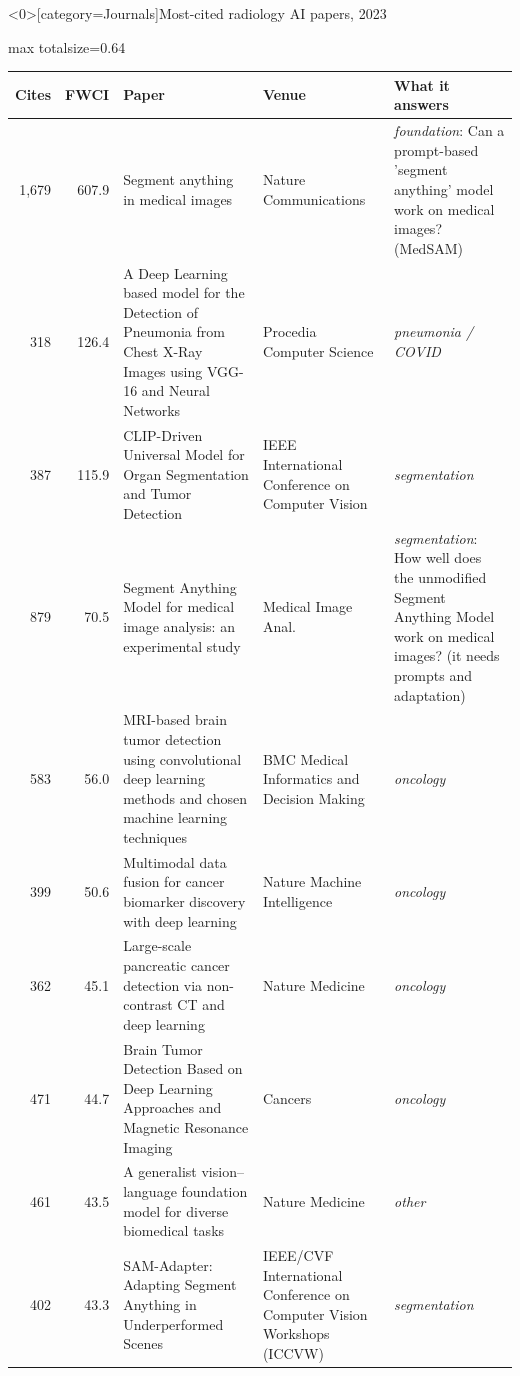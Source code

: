 \documentclass[aspectratio=169]{beamer}
\renewcommand{\arraystretch}{1.08}
\begin{document}
\begin{frame}<0>[category=Journals]{Most-cited radiology AI papers, 2023}
\tiny
\begin{adjustbox}{max totalsize={\textwidth}{0.64\textheight}}
\renewcommand{\arraystretch}{1.2}
\begin{tabular}{|r|r|>{\raggedright\arraybackslash}p{}|>{\raggedright\arraybackslash}p{}|>{\raggedright\arraybackslash}p{}|}
\hline \textbf{Cites} & \textbf{FWCI} & \textbf{Paper} & \textbf{Venue} & \textbf{What it answers} \\ \hline
1,679 & 607.9 & Segment anything in medical images & Nature Communications & \textit{foundation}: Can a prompt-based 'segment anything' model work on medical images? (MedSAM) \\ \hline
318 & 126.4 & A Deep Learning based model for the Detection of Pneumonia from Chest X-Ray Images using VGG-16 and Neural Networks & Procedia Computer Science & \textit{pneumonia / COVID} \\ \hline
387 & 115.9 & CLIP-Driven Universal Model for Organ Segmentation and Tumor Detection & IEEE International Conference on Computer Vision & \textit{segmentation} \\ \hline
879 & 70.5 & Segment Anything Model for medical image analysis: an experimental study & Medical Image Anal. & \textit{segmentation}: How well does the unmodified Segment Anything Model work on medical images? (it needs prompts and adaptation) \\ \hline
583 & 56.0 & MRI-based brain tumor detection using convolutional deep learning methods and chosen machine learning techniques & BMC Medical Informatics and Decision Making & \textit{oncology} \\ \hline
399 & 50.6 & Multimodal data fusion for cancer biomarker discovery with deep learning & Nature Machine Intelligence & \textit{oncology} \\ \hline
362 & 45.1 & Large-scale pancreatic cancer detection via non-contrast CT and deep learning & Nature Medicine & \textit{oncology} \\ \hline
471 & 44.7 & Brain Tumor Detection Based on Deep Learning Approaches and Magnetic Resonance Imaging & Cancers & \textit{oncology} \\ \hline
461 & 43.5 & A generalist vision--language foundation model for diverse biomedical tasks & Nature Medicine & \textit{other} \\ \hline
402 & 43.3 & SAM-Adapter: Adapting Segment Anything in Underperformed Scenes & 2023 IEEE/CVF International Conference on Computer Vision Workshops (ICCVW) & \textit{segmentation} \\ \hline
\end{tabular}
\end{adjustbox}
\\[1pt]
\end{frame}
\end{document}

